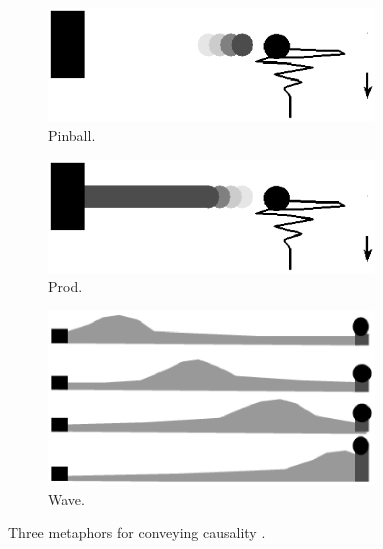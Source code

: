 \begin{figure}
\centering
	\begin{subfigure}[b]{0.3\textwidth}
		\centering
		\includegraphics[width=0.95\textwidth]{figures/eps/vcv_pinball.eps}
		\caption{Pinball.}
		\label{fig:vcvPinball}
	\end{subfigure}	
	\begin{subfigure}[b]{0.3\textwidth}
		\centering
		\includegraphics[width=0.95\textwidth]{figures/eps/vcv_prod.eps}
		\caption{Prod.}
		\label{fig:vcvProd}
	\end{subfigure}
	\begin{subfigure}[b]{0.3\textwidth}
		\centering
		\includegraphics[width=0.95\textwidth]{figures/eps/vcv_wave.eps}
		\caption{Wave.}
		\label{fig:vcvWave}
	\end{subfigure}
	\caption{Three metaphors for conveying causality \cite{ware1999}.}
	\label{fig:vcv}
\end{figure}

